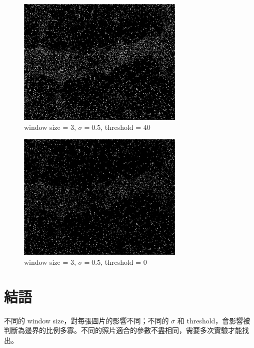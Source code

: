 \documentclass[conference]{IEEEtran}
\begin{document}
\begin{figure}[H]
\centerline{\includegraphics[width=8cm]{dentalXray13.png}}
\caption{window size = $3$, $\sigma=0.5$,  threshold = $40$}
\label{dentalXray13}
\end{figure}

\begin{figure}[H]
\centerline{\includegraphics[width=8cm]{dentalXray14.png}}
\caption{window size = $3$, $\sigma=0.5$,  threshold = $0$}
\label{dentalXray14}
\end{figure}

\section{結語}
不同的 window size，對每張圖片的影響不同；不同的 $\sigma$ 和 threshold，會影響被判斷為邊界的比例多寡。不同的照片適合的參數不盡相同，需要多次實驗才能找出。


\vspace{12pt}
\end{document}
